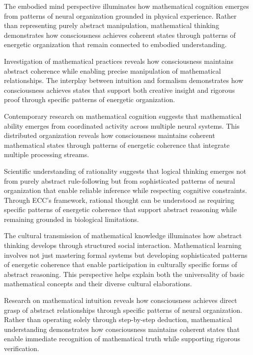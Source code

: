 \begin{refsection}
The embodied mind perspective \cite{Varela1991} illuminates how mathematical cognition emerges from patterns of neural organization grounded in physical experience. Rather than representing purely abstract manipulation, mathematical thinking demonstrates how consciousness achieves coherent states through patterns of energetic organization that remain connected to embodied understanding.

Investigation of mathematical practices \cite{Rotman1993} reveals how consciousness maintains abstract coherence while enabling precise manipulation of mathematical relationships. The interplay between intuition and formalism demonstrates how consciousness achieves states that support both creative insight and rigorous proof through specific patterns of energetic organization.

Contemporary research on mathematical cognition \cite{DAmbrosio1985} suggests that mathematical ability emerges from coordinated activity across multiple neural systems. This distributed organization reveals how consciousness maintains coherent mathematical states through patterns of energetic coherence that integrate multiple processing streams.

Scientific understanding of rationality \cite{Gigerenzer2008} suggests that logical thinking emerges not from purely abstract rule-following but from sophisticated patterns of neural organization that enable reliable inference while respecting cognitive constraints. Through ECC's framework, rational thought can be understood as requiring specific patterns of energetic coherence that support abstract reasoning while remaining grounded in biological limitations.

The cultural transmission of mathematical knowledge \cite{Sperber1996} illuminates how abstract thinking develops through structured social interaction. Mathematical learning involves not just mastering formal systems but developing sophisticated patterns of energetic coherence that enable participation in culturally specific forms of abstract reasoning. This perspective helps explain both the universality of basic mathematical concepts and their diverse cultural elaborations.

Research on mathematical intuition \cite{Barrow1992} reveals how consciousness achieves direct grasp of abstract relationships through specific patterns of neural organization. Rather than operating solely through step-by-step deduction, mathematical understanding demonstrates how consciousness maintains coherent states that enable immediate recognition of mathematical truth while supporting rigorous verification.


\end{refsection}
